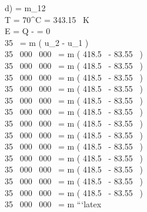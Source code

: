 d) \quad {} \quad {} = \Delta m_{12} \\
T = 70^\circ C = 343.15 \, K \\
\Delta E = Q -  \quad {} = 0 \\
35 \,  = m \left( u_2 - u_1 \right) \\
35 \, 000 \, 000 \,  = m \left( 418.5 \,  - 83.55 \,  \right) \\
35 \, 000 \, 000 \,  = m \left( 418.5 \,  - 83.55 \,  \right) \\
35 \, 000 \, 000 \,  = m \left( 418.5 \,  - 83.55 \,  \right) \\
35 \, 000 \, 000 \,  = m \left( 418.5 \,  - 83.55 \,  \right) \\
35 \, 000 \, 000 \,  = m \left( 418.5 \,  - 83.55 \,  \right) \\
35 \, 000 \, 000 \,  = m \left( 418.5 \,  - 83.55 \,  \right) \\
35 \, 000 \, 000 \,  = m \left( 418.5 \,  - 83.55 \,  \right) \\
35 \, 000 \, 000 \,  = m \left( 418.5 \,  - 83.55 \,  \right) \\
35 \, 000 \, 000 \,  = m \left( 418.5 \,  - 83.55 \,  \right) \\
35 \, 000 \, 000 \,  = m \left( 418.5 \,  - 83.55 \,  \right) \\
35 \, 000 \, 000 \,  = m \left( 418.5 \,  - 83.55 \,  \right) \\
35 \, 000 \, 000 \,  = m \left( 418.5 \,  - 83.55 \,  \right) \\
35 \, 000 \, 000 \,  = m \left( 418.5 \,  - 83.55 \,  \right) \\
35 \, 000 \, 000 \,  = m \left```latex


